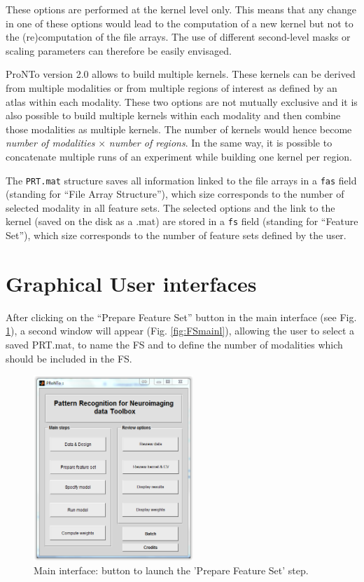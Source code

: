 These options are performed at the kernel level only. This means that any change in one of these options would lead to the computation of a new kernel but not to the (re)computation of the file arrays. The use of different second-level masks or scaling parameters can therefore be easily envisaged.

ProNTo version 2.0 allows to build multiple kernels. These kernels can be derived from multiple modalities or from multiple regions of interest as defined by an atlas within each modality. These two options are not mutually exclusive and it is also possible to build multiple kernels within each modality and then combine those modalities as multiple kernels. The number of kernels would hence become \textit{number of modalities} $\times$ \textit{number of regions}. In the same way, it is possible to concatenate multiple runs of an experiment while building one kernel per region.

The {\tt PRT.mat} structure saves all information linked to the file arrays in a {\tt fas} field (standing for ``File Array Structure''), which size corresponds to the number of selected modality in all feature sets. The selected options and the link to the kernel (saved on the disk as a .mat) are stored in a {\tt fs} field (standing for ``Feature Set''), which size corresponds to the number of feature sets defined by the user.

\section{Graphical User interfaces}

After clicking on the ``Prepare Feature Set'' button in the main interface (see Fig. \ref{fig:mainprep}), a second window will appear (Fig. \ref{fig:FSmainl}), allowing the user to select a saved PRT.mat, to name the FS and to define the number of modalities which should be included in the FS. 
\begin{figure}[!h]
  \begin{center}
      \includegraphics[height=7cm]{images/fig2_main_prt.png}
   \caption{Main interface: button to launch the 'Prepare Feature Set' step.}
    \label{fig:mainprep}
  \end{center}
\end{figure}


